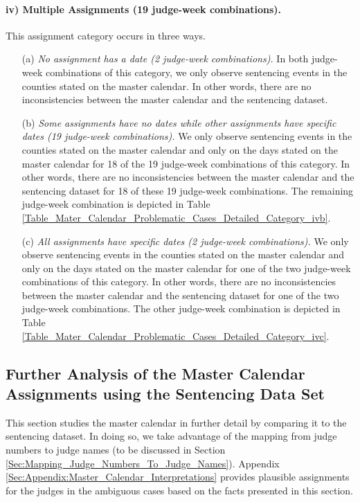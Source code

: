 \documentclass[11pt, oneside]{article}   	%
\theoremstyle{ModifiedStyle}
\begin{document}
\vspace{-3mm}
\paragraph{iv) Multiple Assignments (19 judge-week combinations).} 
\label{Category_iv}
This assignment category occurs in three ways.  
	\begin{itemize}
		\item[(a)] \emph{No assignment has a date (2 judge-week combinations).} In both judge-week combinations of this category, we only observe sentencing events in the counties stated on the master calendar. In other words, there are no inconsistencies between the master calendar and the sentencing dataset.
		\item[(b)] \emph{Some assignments have no dates while other assignments have specific dates (19 judge-week combinations).} We only observe sentencing events in the counties stated on the master calendar and only on the days stated on the master calendar for 18 of the 19 judge-week combinations of this category. In other words, there are no inconsistencies between the master calendar and the sentencing dataset for 18 of these 19 judge-week combinations. The remaining judge-week combination is depicted in Table \ref{Table_Mater_Calendar_Problematic_Cases_Detailed_Category_ivb}.
		\item[(c)] \emph{All assignments have specific dates (2 judge-week combinations).} We only observe sentencing events in the counties stated on the master calendar and only on the days stated on the master calendar for one of the two judge-week combinations of this category. In other words, there are no inconsistencies between the master calendar and the sentencing dataset for one of the two judge-week combinations. The other judge-week combination is depicted in Table \ref{Table_Mater_Calendar_Problematic_Cases_Detailed_Category_ivc}.
	\end{itemize}


\subsection{Further Analysis of the Master Calendar Assignments using the Sentencing Data Set}
\label{Sec:Master_Calendar:Further_Analysis_of_Some_Assignments}

This section studies the master calendar in further detail by comparing it to the sentencing dataset. In doing so, we take advantage of the mapping from judge numbers to judge names (to be discussed in Section \ref{Sec:Mapping_Judge_Numbers_To_Judge_Names}). Appendix \ref{Sec:Appendix:Master_Calendar_Interpretations} provides plausible assignments for the judges in the ambiguous cases based on the facts presented in this section.
\end{document}
